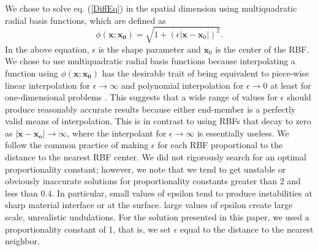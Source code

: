 \documentclass[12pt]{article}
\begin{document}
We chose to solve eq. (\ref{DiffEq}) in the spatial dimension using
multiquadratic radial basis functions, which are defined as
\begin{equation}\label{RBF}
  \phi(\boldsymbol{x};\boldsymbol{x_0}) = \sqrt{1 + (\epsilon|\boldsymbol{x} - \boldsymbol{x}_0|)^2}. 
\end{equation}
In the above equation, $\epsilon$ is the shape parameter and
$\boldsymbol{x}_0$ is the center of the RBF.  We chose to use
multiquadratic radial basis functions because interpolating a function
using $\phi(\boldsymbol{x};\boldsymbol{x_0})$ has the desirable trait of being
equivalent to piece-wise linear interpolation for $\epsilon \to
\infty$ and polynomial interpolation for $\epsilon \to 0$ at least for
one-dimensional problems \citep{D2002}.  This suggests that a wide
range of values for $\epsilon$ should produce reasonably accurate
results because either end-member is a perfectly valid means of
interpolation.  This is in contrast to using RBFs that decay to zero
as $|\boldsymbol{x - x_o}| \to \infty$, where the interpolant for
$\epsilon \to \infty$ is essentially useless.  We follow the common
practice of making $\epsilon$ for each RBF proportional to the
distance to the nearest RBF center.  We did not rigorously search for
an optimal proportionality constant; however, we note that we tend to
get unstable or obviously inaccurate solutions for proportionality
constants greater than $2$ and less than $0.4$.  In particular, small
values of epsilon tend to produce instabilities at sharp material
interface or at the surface.  large values of epsilon create
large scale, unrealistic undulations. For the solution presented in
this paper, we used a proportionality constant of 1, that is, we set
$\epsilon$ equal to the distance to the nearest neighbor.
\end{document}
